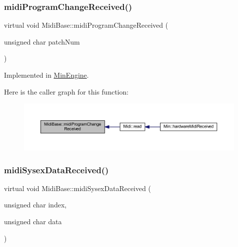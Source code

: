 \subsubsection{\texorpdfstring{midi\+Program\+Change\+Received()}{midiProgramChangeReceived()}}
{\footnotesize\ttfamily virtual void Midi\+Base\+::midi\+Program\+Change\+Received (\begin{DoxyParamCaption}\item[{unsigned char}]{patch\+Num }\end{DoxyParamCaption})\hspace{0.3cm}{\ttfamily [pure virtual]}}



Implemented in \hyperlink{class_min_engine_a0e772deba3710b21ef14f7a72994edb1}{Min\+Engine}.

Here is the caller graph for this function\+:
\nopagebreak
\begin{figure}[H]
\begin{center}
\leavevmode
\includegraphics[width=350pt]{de/def/class_midi_base_a968da0cf67e9a84757cbc2dbce90bc39_icgraph}
\end{center}
\end{figure}
\mbox{\label{class_midi_base_ade00871c0c9e32bfacf34480faf0d37b}} 
\subsubsection{\texorpdfstring{midi\+Sysex\+Data\+Received()}{midiSysexDataReceived()}}
{\footnotesize\ttfamily virtual void Midi\+Base\+::midi\+Sysex\+Data\+Received (\begin{DoxyParamCaption}\item[{unsigned char}]{index,  }\item[{unsigned char}]{data }\end{DoxyParamCaption})\hspace{0.3cm}{\ttfamily [pure virtual]}}



